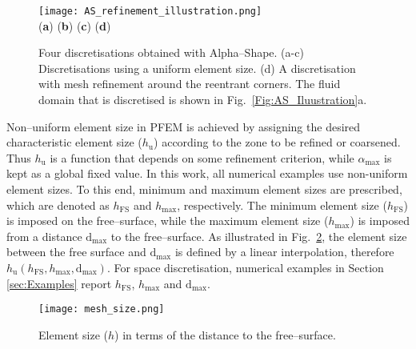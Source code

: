 \documentclass[final,3p,times]{elsarticle}
\begin{document}
\begin{figure}[t!] \captionsetup[sub]{font=normalsize}
	\centering 
	\texttt{[image: AS\_refinement\_illustration.png]}
	\\
	\vspace{-38mm}
	\hspace{-26mm} 
	\footnotesize{(\textbf{a})} 
	\hspace{34mm} 
	(\textbf{b}) 
	\hspace{34mm} 
	(\textbf{c}) 
	\hspace{34mm} 
	(\textbf{d}) 
	\\
	\vspace{33mm}
	\caption{Four discretisations obtained with Alpha--Shape. (a-c) Discretisations using a uniform element size. (d) A discretisation with mesh refinement around the reentrant corners. The fluid domain that is discretised is shown in Fig.~\ref{Fig:AS_Iluustration}a.} 
	\label{Fig:AS_Iluustration_refinement}
\end{figure}


Non--uniform element size in PFEM is achieved by assigning the desired characteristic element size ($h_\mathrm{u}$) according to the zone to be refined or coarsened. Thus $h_\mathrm{u}$ is a function that depends on some refinement criterion, while $\alpha_\mathrm{max}$ is kept as a global fixed value. In this work, all numerical examples use non-uniform element sizes. To this end, minimum and maximum element sizes are prescribed, which are denoted as $h_\mathrm{FS}$ and $h_\mathrm{max}$, respectively. The minimum element size ($h_\mathrm{FS}$) is imposed on the free--surface, while the maximum element size ($h_\mathrm{max}$) is imposed from a distance $\mathrm{d}_\mathrm{max}$ to the free--surface. As illustrated in Fig.~\ref{Fig:meshref}, the element size between the free surface and  $\mathrm{d}_\mathrm{max}$ is defined by a linear interpolation, therefore $h_\mathrm{u}(h_\mathrm{FS},h_\mathrm{max},\mathrm{d}_\mathrm{max})$. For space discretisation, numerical examples in Section \ref{sec:Examples} report $h_\mathrm{FS}$, $h_\mathrm{max}$ and $\mathrm{d}_\mathrm{max}$.


\begin{figure}[t!]
\centering 
\hspace{30mm}\texttt{[image: mesh\_size.png]}
\caption{Element size ($h$) in terms of the distance to the free--surface.}
\label{Fig:meshref}
\end{figure}
\end{document}

